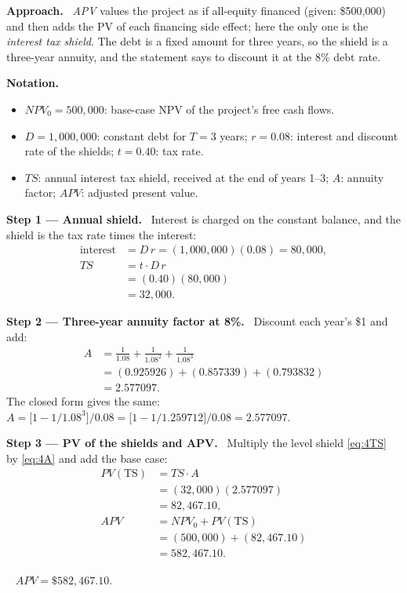 \documentclass[11pt,a4paper]{article}
\numberwithin{equation}{section}
\newcommand{\notation}{\par\smallskip\noindent\textbf{Notation.}}
\newcommand{\step}[2]{\par\smallskip\noindent\textbf{Step #1 --- #2.}~}
\newcommand{\approach}{\par\smallskip\noindent\textbf{Approach.}~}
\newcommand{\answer}[1]{\par\smallskip\noindent\fbox{\textbf{Answer #1.}}~}
\begin{document}
\approach
\emph{APV} values the project as if all-equity financed (given: \$500{,}000) and then adds the
PV of each financing side effect; here the only one is the \emph{interest tax shield}. The debt
is a fixed amount for three years, so the shield is a three-year annuity, and the statement says
to discount it at the 8\% debt rate.

\notation
\begin{itemize}
  \item $\mathit{NPV}_0=500{,}000$: base-case NPV of the project's free cash flows.
  \item $D=1{,}000{,}000$: constant debt for $T=3$ years; $r=0.08$: interest and discount rate of the shields; $t=0.40$: tax rate.
  \item $\mathit{TS}$: annual interest tax shield, received at the end of years 1--3; $A$: annuity factor; $\mathit{APV}$: adjusted present value.
\end{itemize}

\step{1}{Annual shield} Interest is charged on the constant balance, and the shield is the tax
rate times the interest:
\begin{align}
  \text{interest} &= D\,r = (1{,}000{,}000)(0.08) = 80{,}000, \nonumber\\
  \mathit{TS} &= t \cdot D\,r \label{eq:4TS}\\
       &= (0.40)(80{,}000) \nonumber\\
       &= 32{,}000. \nonumber
\end{align}

\step{2}{Three-year annuity factor at 8\%} Discount each year's \$1 and add:
\begin{align}
  A &= \frac{1}{1.08}+\frac{1}{1.08^2}+\frac{1}{1.08^3} \label{eq:4A}\\
    &= (0.925926)+(0.857339)+(0.793832) \nonumber\\
    &= 2.577097. \nonumber
\end{align}
The closed form gives the same: $A=\bigl[1-1/1.08^3\bigr]/0.08=\bigl[1-1/1.259712\bigr]/0.08=2.577097$.

\step{3}{PV of the shields and APV} Multiply the level shield \eqref{eq:4TS} by \eqref{eq:4A}
and add the base case:
\begin{align}
  \mathit{PV}(\text{TS}) &= \mathit{TS}\cdot A \label{eq:4PV}\\
      &= (32{,}000)(2.577097) \nonumber\\
      &= 82{,}467.10, \nonumber\\
  \mathit{APV} &= \mathit{NPV}_0+\mathit{PV}(\text{TS}) \label{eq:4APV}\\
     &= (500{,}000)+(82{,}467.10) \nonumber\\
     &= 582{,}467.10. \nonumber
\end{align}
\answer{(APV)} $\mathit{APV}=\$582{,}467.10$.
\end{document}
